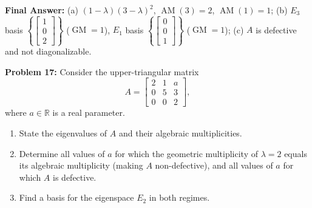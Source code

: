 \documentclass[11pt, letterpaper]{article}
\theoremstyle{definition}
\theoremstyle{remark}
\begin{document}
\textbf{Final Answer:} (a) $(1-\lambda)(3-\lambda)^2$, $\operatorname{AM}(3)=2$, $\operatorname{AM}(1)=1$; (b) $E_3$ basis $\left\{ \begin{bmatrix} 1 \\ 0 \\ 2 \end{bmatrix} \right\}$ ($\operatorname{GM}=1$), $E_1$ basis $\left\{ \begin{bmatrix} 0 \\ 0 \\ 1 \end{bmatrix} \right\}$ ($\operatorname{GM}=1$); (c) $A$ is defective and not diagonalizable.

\vspace{0.4em}
\textbf{Problem 17:}
Consider the upper-triangular matrix
\[
A = \begin{bmatrix} 2 & 1 & a \\ 0 & 5 & 3 \\ 0 & 0 & 2 \end{bmatrix},
\]
where $a \in \mathbb{R}$ is a real parameter.
\begin{enumerate}[label=(\alph*)]
    \item State the eigenvalues of $A$ and their algebraic multiplicities.
    \item Determine all values of $a$ for which the geometric multiplicity of $\lambda = 2$ equals its algebraic multiplicity (making $A$ non-defective), and all values of $a$ for which $A$ is defective.
    \item Find a basis for the eigenspace $E_2$ in both regimes.
\end{enumerate}
\end{document}
